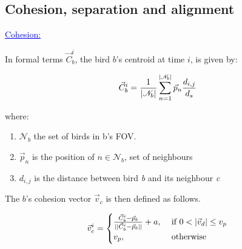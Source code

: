 \documentclass{beamer}
\begin{document}
\subsection{Cohesion, separation and alignment }
\begin{frame}
\textcolor{blue}{\underline{Cohesion:}}

In formal terms \(\vec{C}_b^i\), the bird $b$'s centroid at time $i$, is given by:

\begin{align}
 \vec{C}_b^i = \frac{1}{|\mathcal{N}_b|}\sum_{n=1}^{|\mathcal{N}_b|}{\vec{p}_n  \frac{d_{i,j}}{d_s}} \notag
\end{align}

where:

\begin{enumerate}
\item \(\mathcal{N}_b\) the set of birds in b's FOV.
\item \(\vec{p}_n\) is the position of $n \in \mathcal{N}_b$, set of neighbours
\item \(d_{i,j}\) is the distance between bird \emph{b} and its neighbour
	\emph{c}

\end{enumerate}

The $b$'s cohesion vector \(\vec{v}_c\) is then defined as follows.

\begin{equation}
\vec{v}_c^i =
	\begin{cases}
	 \frac{\vec{C}_b^i - \vec{p}_b}{|| \vec{C}_b^i - \vec{p}_b ||} +
		a, &\mbox{ if } 0 < |\vec{v}_d| \leq v_p \\
		v_p, &\mbox{ otherwise }  \notag
	\end{cases}
\end{equation}
\end{frame}
\end{document}
